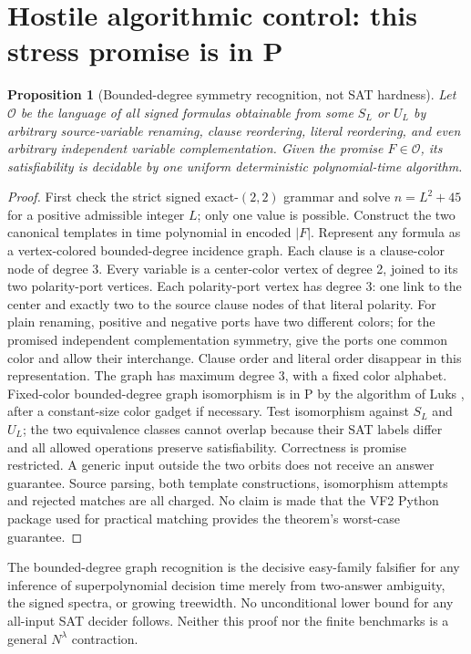 \documentclass[10pt]{article}
\newtheorem{proposition}[theorem]{Proposition}
\begin{document}
\section{Hostile algorithmic control: this stress promise is in P}
\begin{proposition}[Bounded-degree symmetry recognition, not SAT hardness]\label{prop:easy}
Let $\mathcal O$ be the language of all signed formulas obtainable from some $S_L$ or $U_L$ by arbitrary source-variable renaming, clause reordering, literal reordering, and even arbitrary independent variable complementation. Given the promise $F\in\mathcal O$, its satisfiability is decidable by one uniform deterministic polynomial-time algorithm.
\end{proposition}
\begin{proof}
First check the strict signed exact-$(2,2)$ grammar and solve $n=L^2+45$ for a positive admissible integer $L$; only one value is possible. Construct the two canonical templates in time polynomial in encoded $|F|$. Represent any formula as a vertex-colored bounded-degree incidence graph. Each clause is a clause-color node of degree 3. Every variable is a center-color vertex of degree 2, joined to its two polarity-port vertices. Each polarity-port vertex has degree 3: one link to the center and exactly two to the source clause nodes of that literal polarity. For plain renaming, positive and negative ports have two different colors; for the promised independent complementation symmetry, give the ports one common color and allow their interchange. Clause order and literal order disappear in this representation. The graph has maximum degree 3, with a fixed color alphabet. Fixed-color bounded-degree graph isomorphism is in P by the algorithm of Luks \cite{luks}, after a constant-size color gadget if necessary. Test isomorphism against $S_L$ and $U_L$; the two equivalence classes cannot overlap because their SAT labels differ and all allowed operations preserve satisfiability. Correctness is promise restricted. A generic input outside the two orbits does not receive an answer guarantee. Source parsing, both template constructions, isomorphism attempts and rejected matches are all charged. No claim is made that the VF2 Python package used for practical matching provides the theorem's worst-case guarantee.
\end{proof}
The bounded-degree graph recognition is the decisive easy-family falsifier for any inference of superpolynomial decision time merely from two-answer ambiguity, the signed spectra, or growing treewidth. No unconditional lower bound for any all-input SAT decider follows. Neither this proof nor the finite benchmarks is a general $N^\lambda$ contraction.
\end{document}
